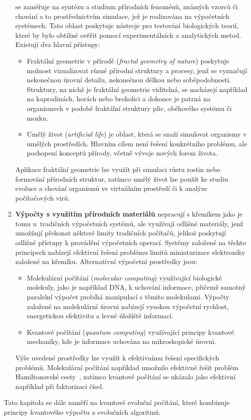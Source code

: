 \begin{enumerate}
        se zaměřuje na syntézu a studium přírodních fenoménů, známých vzorců či chování a to prostřednictvím simulace, jež je realizována na výpočetních systémech. 
        Tato oblast poskytuje nástroje pro testování biologických teorií, které by bylo obtížné ověřit pomocí experimentálních a analytických metod. 
        Existují dva hlavní přístupy:
        \begin{itemize}
            \item Fraktální geometrie v přírodě (\emph{fractal geometry of nature}) poskytuje možnost vizualizovat různé přírodní struktury a procesy, jenž se vyznačují nekonečnou úrovní detailu, nekonečnou délkou nebo soběpodobností. 
                Struktury, na nichž je fraktální geometrie viditelná, se nacházejí například na kapradinách, horách nebo brokolici a dokonce je patrná na organismech v podobě fraktální struktury plic, oběhového systému či mozku. 
            \item Umělý život (\emph{artificial life}) je oblast, která se snaží simulovat organismy v umělých prostředích. 
                Hlavním cílem není řešení konkrétního problému, ale pochopení konceptů přírody, včetně vývoje nových forem života. 
        \end{itemize}
        Aplikace fraktální geometrie lze využít při simulaci růstu rostin nebo formování přírodních struktur, zatímco umělý život lze použít ke studiu evoluce a chování organismů ve virtuálním prostředí či k analýze počítačových virů. 
    \item \textbf{Výpočty s využitím přírodních materiálů} 
        nepracují s křemíkem jako je tomu u~tradičních výpočetních systémů, ale využívají odlišné materiály, jenž umožňují překonat některé limity tradičních počítačů, jelikož poskytují odlišné přístupy k provádění výpočetních operací. 
        Systémy založené na těchto principech nabízejí efektivní řešení problému limitů miniaturizace elektroniky založené na křemíku. 
        Alternativní výpočetní prostředky jsou:
        \begin{itemize}
            \item Molekulární počítání (\emph{molecular computing}) využívající biologické molekuly, jako je například DNA, k uchování informace, přičemž samotný paralelní výpočet probíhá manipulací s těmito molekulami. 
                Výpočty založené na molekulární úrovni nabízejí vysokou výpočetní rychlost, energetickou efektivitu a levné úložiště informací. 
            \item Kvantové počítání (\emph{quantum computing}) využívající principy kvantové mechaniky, kde je informace uchována na mikroskopické úrovni. 
        \end{itemize}
        Výše uvedené prostředky lze využít k efektivnímu řešení specifických problémů. 
        Molekulární počítání například umožnilo efektivně řešit problém Hamiltonovské cesty~\cite{molecular}, zatímco kvantové počítání se ukázalo jako efektivní například při faktorizaci čísel. 
\end{enumerate}
Tato kapitola se dále zaměří na kvantové evoluční počítání, které kombinuje principy kvantového výpočtu a evolučních algoritmů.

